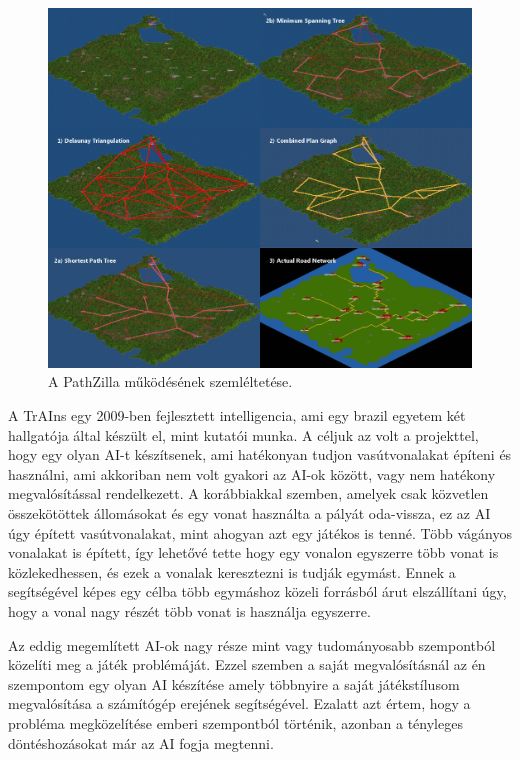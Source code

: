 \begin{figure}
	\centering
	\includegraphics[scale=1]{images/pathzilla.png}
	\caption{A PathZilla működésének szemléltetése.}
	\label{fig:pathzilla}
\end{figure}

A TrAIns egy 2009-ben fejlesztett intelligencia, ami egy brazil egyetem két hallgatója által készült el, mint kutatói munka. A céljuk az volt a projekttel, hogy egy olyan AI-t készítsenek, ami hatékonyan tudjon vasútvonalakat építeni és használni, ami akkoriban nem volt gyakori az AI-ok között, vagy nem hatékony megvalósítással rendelkezett. A korábbiakkal szemben, amelyek csak közvetlen összekötöttek állomásokat és egy vonat használta a pályát oda-vissza, ez az AI úgy épített vasútvonalakat, mint ahogyan azt egy játékos is tenné. Több vágányos vonalakat is épített, így lehetővé tette hogy egy vonalon egyszerre több vonat is közlekedhessen, és ezek a vonalak keresztezni is tudják egymást. Ennek a segítségével képes egy célba több egymáshoz közeli forrásból árut elszállítani úgy, hogy a vonal nagy részét több vonat is használja egyszerre.


Az eddig megemlített AI-ok nagy része mint vagy tudományosabb szempontból közelíti meg a játék problémáját. Ezzel szemben a saját megvalósításnál az én szempontom egy olyan AI készítése amely többnyire a saját játékstílusom megvalósítása a számítógép erejének segítségével. Ezalatt azt értem, hogy a probléma megközelítése emberi szempontból történik, azonban a tényleges döntéshozásokat már az AI fogja megtenni.

